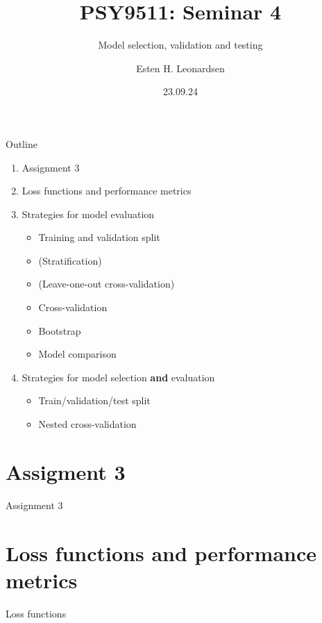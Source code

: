 \documentclass[10pt]{beamer}
\title{PSY9511: Seminar 4}
\subtitle{Model selection, validation and testing}
\author{Esten H. Leonardsen}
\date{23.09.24}
\begin{document}
	\begin{frame}
	 	\titlepage
	\end{frame}

    \begin{frame}{Outline}
        \begin{enumerate}
            \item Assignment 3
            \item Loss functions and performance metrics
            \item Strategies for model evaluation
            \begin{itemize}
                \item Training and validation split
                \item (Stratification)
                \item (Leave-one-out cross-validation)
                \item Cross-validation
                \item Bootstrap
                \item Model comparison
            \end{itemize}
            \item Strategies for model selection \textbf{and} evaluation
            \begin{itemize}
                \item Train/validation/test split
                \item Nested cross-validation
            \end{itemize}
        \end{enumerate}
    \end{frame}

    \section{Assigment 3}

    \begin{frame}{Assignment 3}
    \end{frame}

    \section{Loss functions and performance metrics}

    \begin{frame}{Loss functions}
    \end{frame}

\end{document}
